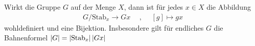 \begin{satz}
    Wirkt die Gruppe $G$ auf der Menge $X$, dann ist für jedes $x \in X$
    die Abbildung
    \begin{align*}
        G / \text{Stab}_x \rightarrow G x
        \hspace{15pt} , \hspace{15pt}
        [g] \mapsto g x
    \end{align*}
    wohldefiniert und eine Bijektion. Insbesondere gilt für endliches $G$
    die Bahnenformel $\left\vert G \right\vert = \left\vert \text{Stab}_x \right\vert \left\vert G x \right\vert$
\end{satz}
